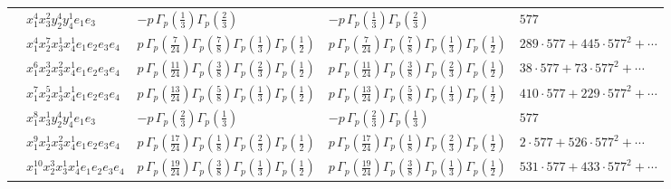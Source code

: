 \documentclass[11pt]{article}
\begin{document}
\begin{table}[ht]
{\begin{tabular}{@{}lllll@{}}
 & $x_{1}^{4} x_{3}^{2} y_{2}^{4} y_{4}^{1} e_{1} e_{3}$ & $- p \, \Gamma_p \left( \frac{1}{3} \right) \Gamma_p \left( \frac{2}{3} \right)$ & $- p \, \Gamma_p \left( \frac{1}{3} \right) \Gamma_p \left( \frac{2}{3} \right)$ & $577$ \\
 & $x_{1}^{4} x_{2}^{7} x_{3}^{1} x_{4}^{1}  e_{1} e_{2} e_{3} e_{4}$ & $p \, \Gamma_p \left( \frac{7}{24} \right) \Gamma_p \left( \frac{7}{8} \right) \Gamma_p \left( \frac{1}{3} \right) \Gamma_p \left( \frac{1}{2} \right)$ & $p \, \Gamma_p \left( \frac{7}{24} \right) \Gamma_p \left( \frac{7}{8} \right) \Gamma_p \left( \frac{1}{3} \right) \Gamma_p \left( \frac{1}{2} \right)$ & $289{\cdot}577{+}445{\cdot}577^{2}{+}\cdots$ \\
 & $x_{1}^{6} x_{2}^{3} x_{3}^{2} x_{4}^{1}  e_{1} e_{2} e_{3} e_{4}$ & $p \, \Gamma_p \left( \frac{11}{24} \right) \Gamma_p \left( \frac{3}{8} \right) \Gamma_p \left( \frac{2}{3} \right) \Gamma_p \left( \frac{1}{2} \right)$ & $p \, \Gamma_p \left( \frac{11}{24} \right) \Gamma_p \left( \frac{3}{8} \right) \Gamma_p \left( \frac{2}{3} \right) \Gamma_p \left( \frac{1}{2} \right)$ & $38{\cdot}577{+}73{\cdot}577^{2}{+}\cdots$ \\
 & $x_{1}^{7} x_{2}^{5} x_{3}^{1} x_{4}^{1}  e_{1} e_{2} e_{3} e_{4}$ & $p \, \Gamma_p \left( \frac{13}{24} \right) \Gamma_p \left( \frac{5}{8} \right) \Gamma_p \left( \frac{1}{3} \right) \Gamma_p \left( \frac{1}{2} \right)$ & $p \, \Gamma_p \left( \frac{13}{24} \right) \Gamma_p \left( \frac{5}{8} \right) \Gamma_p \left( \frac{1}{3} \right) \Gamma_p \left( \frac{1}{2} \right)$ & $410{\cdot}577{+}229{\cdot}577^{2}{+}\cdots$ \\
 & $x_{1}^{8} x_{3}^{1} y_{2}^{4} y_{4}^{1} e_{1} e_{3}$ & $- p \, \Gamma_p \left( \frac{2}{3} \right) \Gamma_p \left( \frac{1}{3} \right)$ & $- p \, \Gamma_p \left( \frac{2}{3} \right) \Gamma_p \left( \frac{1}{3} \right)$ & $577$ \\
 & $x_{1}^{9} x_{2}^{1} x_{3}^{2} x_{4}^{1}  e_{1} e_{2} e_{3} e_{4}$ & $p \, \Gamma_p \left( \frac{17}{24} \right) \Gamma_p \left( \frac{1}{8} \right) \Gamma_p \left( \frac{2}{3} \right) \Gamma_p \left( \frac{1}{2} \right)$ & $p \, \Gamma_p \left( \frac{17}{24} \right) \Gamma_p \left( \frac{1}{8} \right) \Gamma_p \left( \frac{2}{3} \right) \Gamma_p \left( \frac{1}{2} \right)$ & $2{\cdot}577{+}526{\cdot}577^{2}{+}\cdots$ \\
 & $x_{1}^{10} x_{2}^{3} x_{3}^{1} x_{4}^{1}  e_{1} e_{2} e_{3} e_{4}$ & $p \, \Gamma_p \left( \frac{19}{24} \right) \Gamma_p \left( \frac{3}{8} \right) \Gamma_p \left( \frac{1}{3} \right) \Gamma_p \left( \frac{1}{2} \right)$ & $p \, \Gamma_p \left( \frac{19}{24} \right) \Gamma_p \left( \frac{3}{8} \right) \Gamma_p \left( \frac{1}{3} \right) \Gamma_p \left( \frac{1}{2} \right)$ & $531{\cdot}577{+}433{\cdot}577^{2}{+}\cdots$ \\

\end{tabular}}
\end{table}
\end{document}
